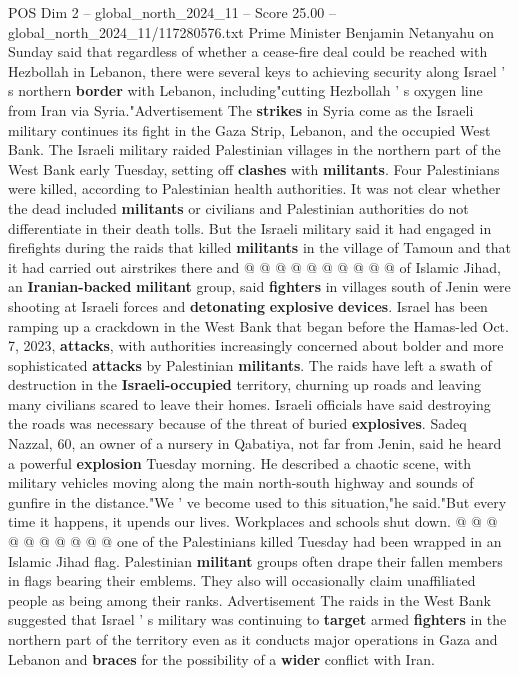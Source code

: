 \begin{textsample}{POS Dim 2 – global\_north\_2024\_11 – Score 25.00 – global\_north\_2024\_11/117280576.txt}
Prime Minister Benjamin Netanyahu on Sunday said that regardless of whether a cease-fire deal could be reached with Hezbollah in Lebanon, there were several keys to achieving security along Israel ' s northern \textbf{border} with Lebanon, including"cutting Hezbollah ' s oxygen line from Iran via Syria."Advertisement The \textbf{strikes} in Syria come as the Israeli military continues its fight in the Gaza Strip, Lebanon, and the occupied West Bank.
The Israeli military raided Palestinian villages in the northern part of the West Bank early Tuesday, setting off \textbf{clashes} with \textbf{militants}.
Four Palestinians were killed, according to Palestinian health authorities.
It was not clear whether the dead included \textbf{militants} or civilians and Palestinian authorities do not differentiate in their death tolls.
But the Israeli military said it had engaged in firefights during the raids that killed \textbf{militants} in the village of Tamoun and that it had carried out airstrikes there and @ @ @ @ @ @ @ @ @ @ of Islamic Jihad, an \textbf{Iranian-backed} \textbf{militant} group, said \textbf{fighters} in villages south of Jenin were shooting at Israeli forces and \textbf{detonating} \textbf{explosive} \textbf{devices}.
Israel has been ramping up a crackdown in the West Bank that began before the Hamas-led Oct. 7, 2023, \textbf{attacks}, with authorities increasingly concerned about bolder and more sophisticated \textbf{attacks} by Palestinian \textbf{militants}.
The raids have left a swath of destruction in the \textbf{Israeli-occupied} territory, churning up roads and leaving many civilians scared to leave their homes.
Israeli officials have said destroying the roads was necessary because of the threat of buried \textbf{explosives}.
Sadeq Nazzal, 60, an owner of a nursery in Qabatiya, not far from Jenin, said he heard a powerful \textbf{explosion} Tuesday morning.
He described a chaotic scene, with military vehicles moving along the main north-south highway and sounds of gunfire in the distance."We ' ve become used to this situation,"he said."But every time it happens, it upends our lives.
Workplaces and schools shut down. @ @ @ @ @ @ @ @ @ @ one of the Palestinians killed Tuesday had been wrapped in an Islamic Jihad flag.
Palestinian \textbf{militant} groups often drape their fallen members in flags bearing their emblems.
They also will occasionally claim unaffiliated people as being among their ranks.
Advertisement The raids in the West Bank suggested that Israel ' s military was continuing to \textbf{target} armed \textbf{fighters} in the northern part of the territory even as it conducts major operations in Gaza and Lebanon and \textbf{braces} for the possibility of a \textbf{wider} conflict with Iran.

\end{textsample}
